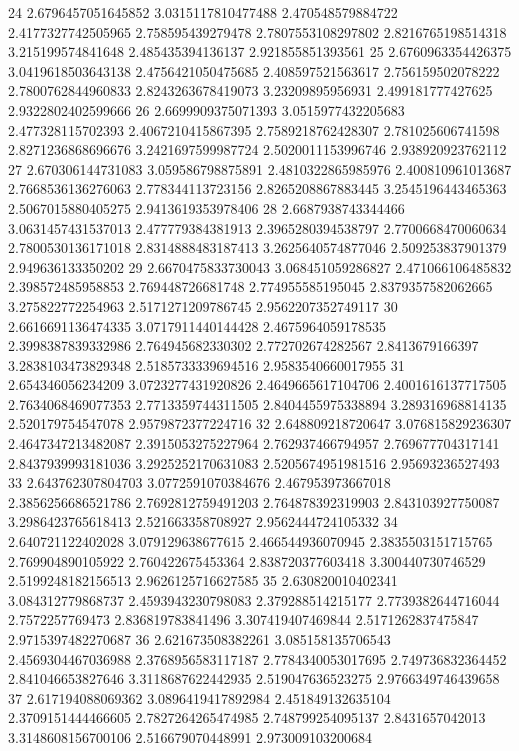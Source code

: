 24 2.6796457051645852 3.0315117810477488 2.470548579884722 2.4177327742505965 2.758595439279478 2.7807553108297802 2.8216765198514318 3.215199574841648 2.485435394136137 2.921855851393561
25 2.6760963354426375 3.0419618503643138 2.4756421050475685 2.408597521563617 2.756159502078222 2.7800762844960833 2.8243263678419073 3.23209895956931 2.499181777427625 2.9322802402599666
26 2.6699909375071393 3.0515977432205683 2.477328115702393 2.4067210415867395 2.7589218762428307 2.781025606741598 2.8271236868696676 3.2421697599987724 2.5020011153996746 2.938920923762112
27 2.670306144731083 3.059586798875891 2.4810322865985976 2.400810961013687 2.7668536136276063 2.778344113723156 2.8265208867883445 3.2545196443465363 2.5067015880405275 2.9413619353978406
28 2.6687938743344466 3.0631457431537013 2.477779384381913 2.3965280394538797 2.7700668470060634 2.7800530136171018 2.8314888483187413 3.2625640574877046 2.509253837901379 2.949636133350202
29 2.6670475833730043 3.068451059286827 2.471066106485832 2.398572485958853 2.769448726681748 2.774955585195045 2.8379357582062665 3.275822772254963 2.5171271209786745 2.9562207352749117
30 2.6616691136474335 3.0717911440144428 2.4675964059178535 2.3998387839332986 2.764945682330302 2.772702674282567 2.8413679166397 3.2838103473829348 2.5185733339694516 2.9583540660017955
31 2.654346056234209 3.0723277431920826 2.4649665617104706 2.4001616137717505 2.7634068469077353 2.7713359744311505 2.8404455975338894 3.289316968814135 2.520179754547078 2.9579872377224716
32 2.648809218720647 3.076815829236307 2.4647347213482087 2.3915053275227964 2.762937466794957 2.769677704317141 2.8437939993181036 3.2925252170631083 2.5205674951981516 2.95693236527493
33 2.643762307804703 3.0772591070384676 2.467953973667018 2.3856256686521786 2.7692812759491203 2.764878392319903 2.843103927750087 3.2986423765618413 2.521663358708927 2.9562444724105332
34 2.640721122402028 3.079129638677615 2.466544936070945 2.3835503151715765 2.769904890105922 2.760422675453364 2.838720377603418 3.300440730746529 2.5199248182156513 2.9626125716627585
35 2.630820010402341 3.084312779868737 2.4593943230798083 2.379288514215177 2.7739382644716044 2.7572257769473 2.836819783841496 3.307419407469844 2.5171262837475847 2.9715397482270687
36 2.621673508382261 3.085158135706543 2.4569304467036988 2.3768956583117187 2.7784340053017695 2.749736832364452 2.841046653827646 3.3118687622442935 2.519047636523275 2.9766349746439658
37 2.617194088069362 3.0896419417892984 2.451849132635104 2.3709151444466605 2.7827264265474985 2.748799254095137 2.8431657042013 3.3148608156700106 2.516679070448991 2.973009103200684
